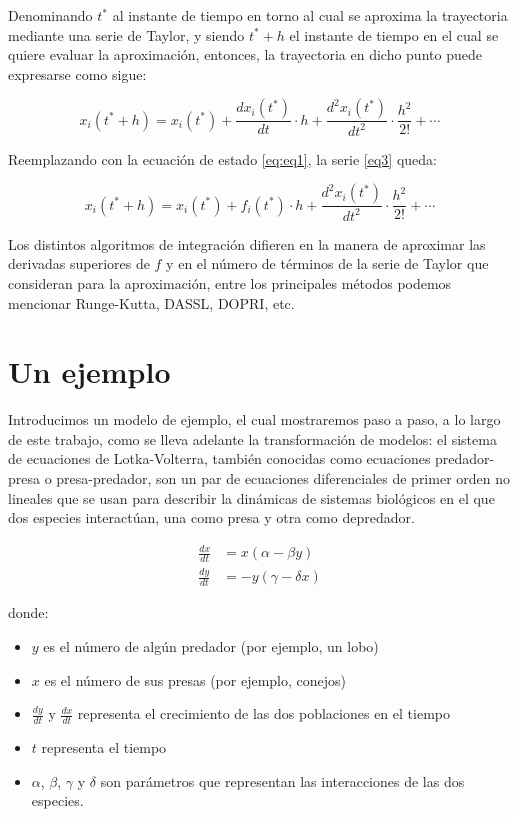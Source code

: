 	Denominando $t^{\ast}$ al instante de tiempo en torno al cual se aproxima la trayectoria mediante una serie de Taylor, y siendo $t^{\ast} + h$
	 el instante de tiempo en el cual se quiere evaluar la aproximación, entonces, la trayectoria en dicho punto puede expresarse como sigue:

	\begin{equation} \label{eq3}
		x_i(t^* + h) = x_i(t^*) + \frac{dx_i (t^*)}{dt} \cdot h + \frac{d^{2}x_i (t^*)}{dt^2} \cdot \frac{h^2}{2!} + \cdots
	\end{equation}

	Reemplazando con la ecuación de estado \ref{eq:eq1}, la serie \eqref{eq3} queda:

	\begin{equation} \label{eq4}
		x_i(t^* + h) = x_i(t^*) + f_i(t^*) \cdot h + \frac{d^{2}x_i (t^*)}{dt^2} \cdot \frac{h^2}{2!} + \cdots
	\end{equation}

	Los distintos algoritmos de integración difieren en la manera de aproximar las derivadas superiores de $f$ y en el número de
	 términos de la serie de Taylor que consideran para la aproximación, entre los principales métodos podemos mencionar Runge-Kutta\cite{Cel06}, DASSL\cite{DASSL}, DOPRI\cite{DP80}, etc.

\section{Un ejemplo}
	Introducimos un modelo de ejemplo, el cual mostraremos paso a paso, a lo largo de este trabajo, como se lleva adelante la transformación de modelos: 
	el sistema de ecuaciones de Lotka-Volterra, también conocidas como ecuaciones predador-presa o presa-predador,
	son un par de ecuaciones diferenciales de primer orden no lineales que se usan para describir la dinámicas de sistemas biológicos en el que dos 
	especies interactúan, una como presa y otra como depredador.
	\label{lotka_volterra_ref}

	\begin{align*}
		\frac{dx}{dt} &= x(\alpha - \beta y) \\
		\frac{dy}{dt} &= - y(\gamma - \delta  x)
	\end{align*}

	donde:
	\begin{itemize}
		\item $y$ es el número de algún predador (por ejemplo, un lobo)
		\item $x$ es el número de sus presas (por ejemplo, conejos)
		\item $\frac{dy}{dt}$ y $\frac{dx}{dt}$ representa el crecimiento de las dos poblaciones en el tiempo
		\item $t$ representa el tiempo
		\item $\alpha$, $\beta$, $\gamma$ y $\delta$ son parámetros que representan las interacciones de las dos especies.
	\end{itemize}

